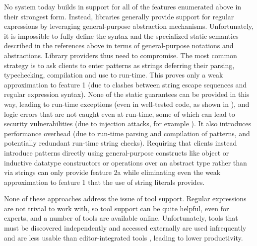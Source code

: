 No system today builds in support for all of the features enumerated above in their strongest form. Instead, libraries generally provide support for regular expressions by leveraging  general-purpose abstraction mechanisms. Unfortunately, it is impossible to fully define the syntax and the specialized static semantics described in the references above in terms of general-purpose notations and abstractions. Library providers thus need to compromise. The most common strategy is to ask clients to enter patterns as strings deferring their parsing, typechecking, compilation and use to run-time. This proves only a weak approximation to feature 1 (due to clashes between string escape sequences and regular expression syntax). None of the static guarantees can be provided in this way, leading to run-time exceptions (even in well-tested code, as shown in \cite{spishak2012type}), and logic errors that are not caught even at run-time, some of which can lead to security vulnerabilities (due to injection attacks, for example \cite{owasp2013}). It also introduces performance overhead (due to run-time parsing and compilation of patterns, and potentially redundant run-time string checks). Requiring that clients instead introduce patterns directly using general-purpose constructs like object or inductive datatype constructors or operations over an abstract type rather than via strings can only provide feature 2a while eliminating even the weak approximation to feature 1 that the use of string literals provides. 

None of these approaches address the issue of tool support. Regular expressions are not trivial to work with, so tool support can be quite helpful, even for experts, and a number of tools are available online. Unfortunately, tools that must be discovered independently and accessed externally are used infrequently \cite{Murphy-Hill:2011:PIE:1958824.1958888} and are less usable than editor-integrated tools \cite{Campbell:2008:DRT:1636642.1636651, Omar:2012:ACC:2337223.2337324}, leading to lower productivity.

